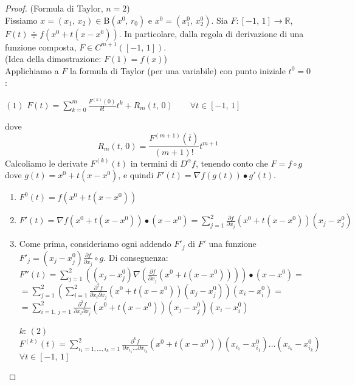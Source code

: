 \begin{proof}
(Formula di Taylor, $n=2$)\\
Fissiamo $x=(x_1,\,x_2) \in \mathrm{B}(x^0,\,r_0)$ e $x^0=(x_1^0,\,x_2^0)$. Sia $F : [-1,\,1] \rightarrow \mathbb{R}$, $F(t) \doteqdot f(x^0 + t(x-x^0))$. In particolare, dalla regola di derivazione di una funzione composta, $F \in C^{m+1} ([-1,\,1])$.\\
(Idea della dimostrazione: $F(1)=f(x)$)\\
Applichiamo a $F$ la formula di Taylor (per una variabile) con punto iniziale $t^0 = 0$:
\begin{center}
$\mathrm{(1)}$
\hfill
$\displaystyle F(t) = \sum_{k=0}^{m} \frac{F^{(k)}(0)}{k!}t^k + R_m(t,\,0) \qquad \forall t \in [-1,\,1]$
\hfill \null \\
\end{center}
dove 
$$R_m(t,\,0) = \frac{F^{(m+1)}(\overline{t})}{(m+1)!}t^{m+1}$$
Calcoliamo le derivate $F^{(k)}(t)$ in termini di $D^{\alpha}f$, tenendo conto che $F = f \circ g$ dove $g(t) = x^0+t(x-x^0)$, e quindi $F'(t) = \nabla f(g(t)) \bullet g'(t)$.
\begin{enumerate}[labelindent=\parindent,leftmargin=*,label=\underline{\textnormal{$k=\arabic*$}}:,start=0]
\item $\displaystyle F^{0}(t)=f(x^0+t(x-x^0))$
\item $\displaystyle F'(t) = \nabla f(x^0+t(x-x^0)) \bullet (x-x^0) = \sum_{j=1}^2 \frac{\partial f}{\partial x_j} (x^0+t(x-x^0))(x_j-x_j^0)$
\item Come prima, consideriamo ogni addendo $F'_j$ di $F'$ una funzione $\displaystyle F'_j =  (x_j-x_j^0)\frac{\partial f}{\partial x_j} \circ g$. Di conseguenza:\\
$\displaystyle F''(t) = \sum_{j=1}^2 \left ( (x_j-x_j^0) \nabla \left( \frac{\partial f}{\partial x_j} (x^0+t(x-x^0)) \right) \right) \bullet (x-x^0)=$\\
$\displaystyle =
\sum_{j=1}^2
\left( 
\sum_{i=1}^2 \frac{\partial^2 f}{\partial x_i \partial x_j} (x^0+t(x-x^0))(x_j-x_j^0)
\right) 
(x_i-x_i^0) = $\\
$\displaystyle =
\sum_{i=1,\,j=1}^2
\frac{\partial^2 f}{\partial x_i \partial x_j} (x^0+t(x-x^0))(x_j-x_j^0)(x_i-x_i^0)$
\item[\underline{\textnormal{$k$}}:] $\displaystyle \mathrm{(2)}$\\
$ \displaystyle F^{(k)}(t) = 
\sum_{i_1=1,\ldots,i_k=1}^2
\frac{\partial^k f}{\partial x_{i_1} \ldots \partial x_{i_k}}(x^0+t(x-x^0))
(x_{i_1}-x_{i_1}^0) \ldots (x_{i_k}-x_{i_k}^0)$\\
$\displaystyle \forall t \in [-1,\,1]$
\end{enumerate}


\end{proof}
